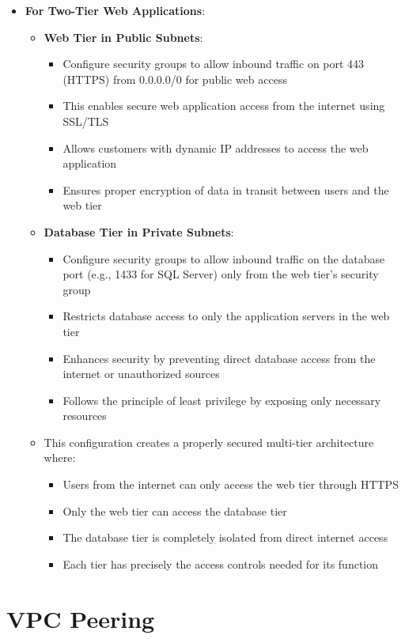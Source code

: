 \documentclass[11pt,a4paper]{report}
\begin{document}
\begin{itemize}
  \item \textbf{For Two-Tier Web Applications}:
\begin{itemize}
  \item \textbf{Web Tier in Public Subnets}:
\begin{itemize}
  \item Configure security groups to allow inbound traffic on port 443 (HTTPS) from 0.0.0.0/0 for public web access
  \item This enables secure web application access from the internet using SSL/TLS
  \item Allows customers with dynamic IP addresses to access the web application
  \item Ensures proper encryption of data in transit between users and the web tier
\end{itemize}
  \item \textbf{Database Tier in Private Subnets}:
\begin{itemize}
  \item Configure security groups to allow inbound traffic on the database port (e.g., 1433 for SQL Server) only from the web tier's security group
  \item Restricts database access to only the application servers in the web tier
  \item Enhances security by preventing direct database access from the internet or unauthorized sources
  \item Follows the principle of least privilege by exposing only necessary resources
\end{itemize}
  \item This configuration creates a properly secured multi-tier architecture where:
\begin{itemize}
  \item Users from the internet can only access the web tier through HTTPS
  \item Only the web tier can access the database tier
  \item The database tier is completely isolated from direct internet access
  \item Each tier has precisely the access controls needed for its function
\end{itemize}
\end{itemize}
\end{itemize}


\section{VPC Peering}
\end{document}
